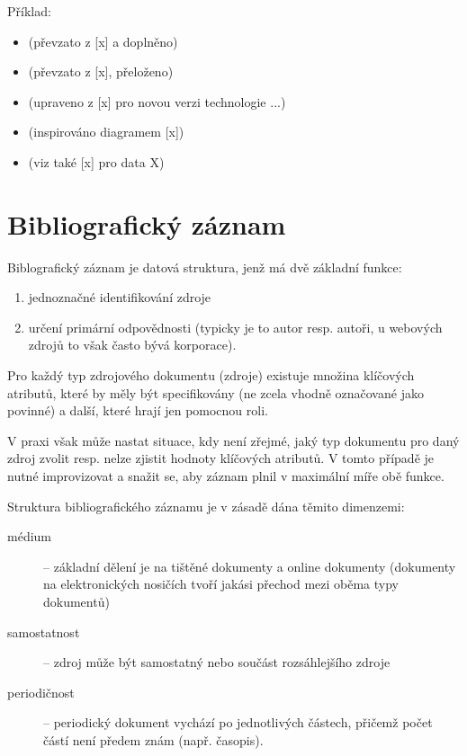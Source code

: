 \documentclass[male,czech,api_bc]{kitheses}
\begin{document}
Příklad:

\begin{itemize}
\item (převzato z [x] a doplněno)
\item (převzato z [x], přeloženo)
\item (upraveno z [x] pro novou verzi technologie ...)
\item (inspirováno diagramem [x])
\item (viz také [x] pro data X)
\end{itemize}


\section{Bibliografický záznam}

Biblografický záznam je datová struktura, jenž má dvě základní funkce:

\begin{enumerate}
\item jednoznačné identifikování zdroje
\item určení primární odpovědnosti (typicky je to autor resp. autoři, u webových zdrojů to však často bývá korporace).
\end{enumerate}

Pro každý typ zdrojového dokumentu (zdroje) existuje množina klíčových atributů, které by měly být specifikovány (ne zcela vhodně označované jako povinné) a další, které hrají jen pomocnou roli.

V praxi však může nastat situace, kdy není zřejmé, jaký typ dokumentu pro daný zdroj zvolit resp.  nelze zjistit hodnoty klíčových atributů. V tomto případě je nutné improvizovat a snažit se, aby záznam plnil v maximální míře obě funkce.

Struktura bibliografického záznamu je v zásadě dána těmito dimenzemi:

\begin{description}
\item[médium] -- základní dělení je na tištěné dokumenty a online dokumenty (dokumenty na elektronických nosičích tvoří jakási přechod mezi oběma typy dokumentů)
\item[samostatnost] -- zdroj může být samostatný nebo součást rozsáhlejšího zdroje
\item[periodičnost] -- periodický dokument vychází po jednotlivých částech, přičemž počet částí není předem znám (např. časopis).  
\end{description}
\end{document}
